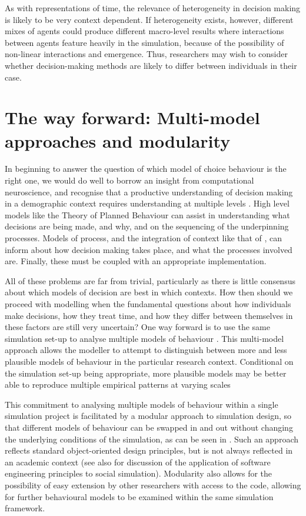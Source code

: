 \documentclass{article}
\begin{document}
As with representations of time, the relevance of heterogeneity in
decision making is likely to be very context dependent. If heterogeneity exists,
however, different mixes of agents could produce different macro-level
results where interactions between agents feature heavily in the
simulation, because of the possibility of non-linear interactions and
emergence. Thus, researchers may wish to consider whether
decision-making methods are likely to differ between individuals in
their case.

\section{The way forward: Multi-model approaches and
modularity}\label{multi-model-approaches-and-modularity}

In beginning to answer the question of which model of choice behaviour is the right one, we would do well to borrow an insight from computational neuroscience, and recognise that a productive understanding of decision making in a demographic context requires understanding at multiple levels \citep{Marr1976,Marr1982}. High level models like the Theory of Planned Behaviour \citep{Ajzen1991} can assist in understanding what decisions are being made, and why, and on the sequencing of the underpinning processes. Models of process, and the integration of context like that of \citet{Ben-Akiva2012}, can inform about how decision making takes place, and what the processes involved are. Finally, these must be coupled with an appropriate implementation. 

All of these problems are far from trivial, particularly as there is
little consensus about which models of decision are best in which
contexts. How then should we proceed with modelling when the fundamental
questions about how individuals make decisions, how they treat time, and
how they differ between themselves in these factors are still very
uncertain? One way forward is to use the same simulation set-up to
analyse multiple models of behaviour \citep{Rossiter2014}. This
multi-model approach allows the modeller to attempt to distinguish
between more and less plausible models of behaviour in the particular
research context. Conditional on the simulation set-up being
appropriate, more plausible models may be better able to reproduce
multiple empirical patterns at varying scales
\citep{Werker2004, Bianchi2008}

This commitment to analysing multiple models of behaviour within a
single simulation project is facilitated by a modular approach to
simulation design, so that different models of behaviour can be swapped
in and out without changing the underlying conditions of the simulation,
as can be seen in \citet{Gray2016}. Such an approach reflects standard
object-oriented design principles, but is not always reflected in an
academic context (see also \citet{Rossiter2015} for discussion of the
application of software engineering principles to social simulation).
Modularity also allows for the possibility of easy extension by other
researchers with access to the code, allowing for further behavioural
models to be examined within the same simulation framework.
\end{document}
